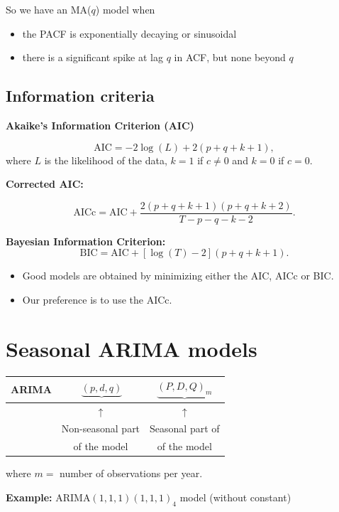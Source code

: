 \documentclass[]{book}
\providecommand{\tightlist}{%
  \setlength{\itemsep}{0pt}\setlength{\parskip}{0pt}}
\begin{document}
So we have an MA(\(q\)) model when

\begin{itemize}
\tightlist
\item
  the PACF is exponentially decaying or sinusoidal
\item
  there is a significant spike at lag \(q\) in ACF, but none beyond \(q\)
\end{itemize}

\hypertarget{information-criteria}{%
\subsection{Information criteria}\label{information-criteria}}

\textbf{Akaike's Information Criterion (AIC)}

\[\text{AIC} = -2 \log(L) + 2(p+q+k+1),\]
where \(L\) is the likelihood of the data, \(k=1\) if \(c\ne0\) and \(k=0\) if \(c=0\).

\textbf{Corrected AIC:}

\[\text{AICc} = \text{AIC} + \displaystyle\frac{2(p+q+k+1)(p+q+k+2)}{T-p-q-k-2}.\]

\textbf{Bayesian Information Criterion:}
\[\text{BIC} = \text{AIC} + [\log(T)-2](p+q+k+1).\]

\begin{itemize}
\tightlist
\item
  Good models are obtained by minimizing either the AIC, AICc or BIC.
\item
  Our preference is to use the AICc.
\end{itemize}

\newpage

\hypertarget{seasonal-arima-models}{%
\section{Seasonal ARIMA models}\label{seasonal-arima-models}}

\begin{longtable}[]{@{}rcc@{}}
\toprule
ARIMA & \(~\underbrace{(p, d, q)}\) & \(\underbrace{(P, D, Q)_{m}}\)\tabularnewline
\midrule
\endhead
& \({\uparrow}\) & \({\uparrow}\)\tabularnewline
& Non-seasonal part & Seasonal part of\tabularnewline
& of the model & of the model\tabularnewline
\bottomrule
\end{longtable}

where \(m =\) number of observations per year.

\textbf{Example:}
ARIMA\((1, 1, 1)(1, 1, 1)_{4}\) model (without constant)
\end{document}
